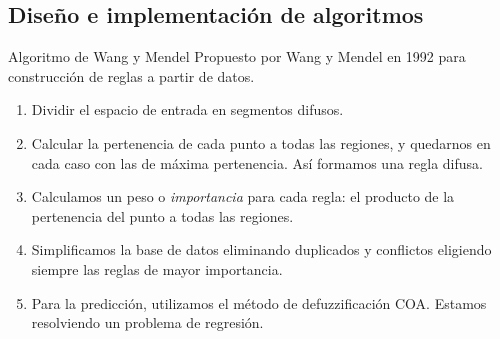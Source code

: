 \documentclass[10pt, spanish]{beamer}
\begin{document}
\subsection{Diseño e implementación de algoritmos}



\begin{frame}{Algoritmo de Wang y Mendel}
  Propuesto por Wang y Mendel en 1992 para construcción de reglas a partir de datos.

  \begin{enumerate}
    \item Dividir el espacio de entrada en segmentos difusos.
    \item Calcular la pertenencia de cada punto a todas las regiones, y quedarnos en cada caso con las de máxima pertenencia. Así formamos una regla difusa.
    \item Calculamos un peso o \textit{importancia} para cada regla: el producto de la pertenencia del punto a todas las regiones.
    \item Simplificamos la base de datos eliminando duplicados y conflictos eligiendo siempre las reglas de mayor importancia.
    \item Para la predicción, utilizamos el método de defuzzificación COA. Estamos resolviendo un problema de regresión.
  \end{enumerate}
\end{frame}
\end{document}

